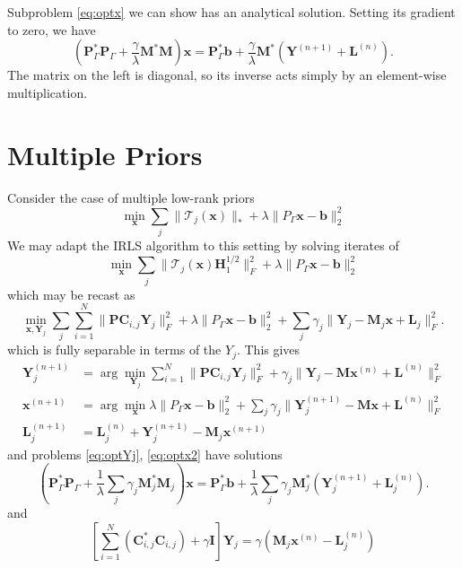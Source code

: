 \documentclass[11pt,draftcls,onecolumn]{IEEEtran}
\newcommand{\mbf}{\mathbf}
\begin{document}
Subproblem \eqref{eq:optx} we can show has an analytical solution. Setting its gradient to zero, we have
\[
\left(\mbf P_\Gamma^*\mbf P_\Gamma + \frac{\gamma}{\lambda}\mbf M^*\mbf M\right) \mbf x = \mbf P_\Gamma^*\mbf b + \frac{\gamma}{\lambda}\mbf M^*(\mbf Y^{(n+1)} + \mbf L^{(n)}). 
\]
The matrix on the left is diagonal, so its inverse acts simply by an element-wise multiplication.

\section{Multiple Priors}
Consider the case of multiple low-rank priors
\[
\min_{\mbf x} \sum_j \|\mathcal{T}_j(\mbf x)\|_* + \lambda\|P_\Gamma \mbf x - \mbf b\|_2^2
\]
We may adapt the IRLS algorithm to this setting by solving iterates of
\[
\min_{\mbf x} \sum_j \|\mathcal{T}_j(\mbf x)\mbf H^{1/2}_1\|_F^2 + \lambda\|P_\Gamma \mbf x - \mbf b\|_2^2
\]
which may be recast as
\[
\min_{\mbf x,\mbf Y_j} \sum_j \sum_{i=1}^N\|\mbf P \mbf C_{i,j} \mbf Y_j\|_F^2 + \lambda \|P_\Gamma \mbf x - \mbf b\|_2^2 + \sum_j \gamma_j \| \mbf Y_j - \mbf M_j\mbf x + \mbf L_j \|_F^2.
\]
which is fully separable in terms of the $Y_j$. This gives
\begin{align}
\label{eq:optYj}
\mbf Y_j^{(n+1)} & = \arg\min_{\mbf Y_j} \sum_{i=1}^N\|\mbf P \mbf C_{i,j} \mbf Y_j\|_F^2  + \gamma_j \| \mbf Y_j - \mbf M\mbf x^{(n)} + \mbf L^{(n)} \|_F^2\\
\label{eq:optx2}
\mbf x^{(n+1)} & = \arg\min_{\mbf x} \lambda\|P_\Gamma \mbf x - \mbf b\|_2^2 + \sum_j \gamma_j \| \mbf Y_j^{(n+1)} - \mbf M\mbf x + \mbf L^{(n)}\|_F^2\\
\label{eq:optLamj}
\mbf L_j^{(n+1)} & = \mbf L_j^{(n)} +  \mbf Y_j^{(n+1)} - \mbf M_j\mbf x^{(n+1)}
\end{align}
and problems \eqref{eq:optYj}, \eqref{eq:optx2} have solutions
\[
\left(\mbf P_\Gamma^*\mbf P_\Gamma + \frac{1}{\lambda}\sum_j \gamma_j \mbf M_j^*\mbf M_j\right) \mbf x = \mbf P_\Gamma^*\mbf b + \frac{1}{\lambda}\sum_j \gamma_j \mbf M_j^*(\mbf Y_j^{(n+1)} + \mbf L_j^{(n)}). 
\]
and
\[
\left[\sum_{i=1}^N (\mbf C_{i,j}^*\mbf C_{i,j} ) + \gamma \mbf I\right] \mbf Y_j = \gamma(\mbf M_j\mbf x^{(n)} - \mbf L_j^{(n)})
\]
\end{document}
